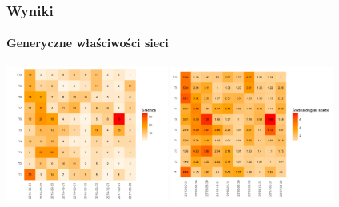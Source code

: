 \documentclass[]{beamer}
\newcommand{\sizequad}{0.40}
\begin{document}
\begin{frame}
 \frametitle{Wyniki}
 \framesubtitle{Generyczne właściwości sieci}
  \begin{minipage}{\textwidth}
     \centering
 			\includegraphics[width=\sizequad\textwidth]{pictures/srednica/srednica_hm.png}\quad  
            \includegraphics[width=\sizequad\textwidth]{pictures/srednia_dlugosc_sciezki/srednia_dlugosc_sciezki_hm.png}  \\

\end{minipage}
\end{frame}
\end{document}
